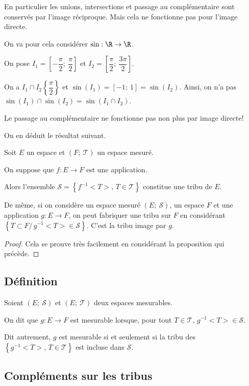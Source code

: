 En particulier les unions, intersections et passage au complémentaire sont conservés par l'image réciproque. Mais cela ne fonctionne pas pour l'image directe.

On va pour cela considérer $\sin: \R \to \R$. 

On pose $I_1 = \left[-\dfrac{\pi}{2};~\dfrac{\pi}{2}\right]$ et $I_2 = \left[\dfrac{\pi}{2};~\dfrac{3\pi}{2}\right]$.

On a $I_1 \cap I_2 \left \{ \dfrac{\pi}{2} \right \}$ et $\sin(I_1)=[-1;~1]=\sin(I_2)$. Ainsi, on n'a pas $\sin(I_1) \cap \sin(I_2) = \sin\left(I_1 \cap I_2\right)$. 

Le passage au complémentaire ne fonctionne pas non plus par image directe!

On en déduit le résultat suivant.

\begin{prop}
Soit $E$ un espace et $(F;~\mathcal{T})$ un espace mesuré.

On suppose que $f: E \to F$ est une application.

Alors l'ensemble $\mathcal{S} = \left \{ f^{-1}<T>, \, T \in \mathcal{T} \right \}$ constitue une tribu de $E$.

De même, si on considère un espace mesuré $(E;~\mathcal{S})$, un espace $F$ et une application $g: E \to F$, on peut fabriquer une tribu sur $F$ en considérant $\left \{ T \subset F/ \, g^{-1}<T> \in \mathcal{S}\right \}$. C'est la tribu image par $g$.
\end{prop}


\begin{proof}
Cela se prouve très facilement en considérant la proposition qui précède.
\end{proof}


\subsection{Définition}

Soient $(E;~\mathcal{S})$ et $(E;~\mathcal{T})$ deux espaces mesurables.

On dit que $g: E \to F$ est mesurable lorsque, pour tout $T \in \mathcal{T}$, $g^{-1}<T> \in \mathcal{S}$.

Dit autrement, $g$ est mesurable si et seulement si la tribu  des $\left \{g^{-1}<T>, \, T \in \mathcal{T}  \right \}$ est incluse dans $\mathcal{S}$.

\subsection{Compléments sur les tribus}

